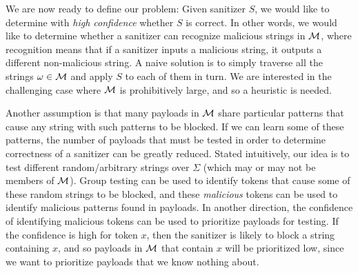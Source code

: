 We are now ready to define our problem: Given sanitizer $S$, we would like to determine with \emph{high confidence} whether $S$ is correct. In other words, we would like to determine whether a sanitizer can recognize malicious strings in $\cal{M}$, where recognition means that if a sanitizer inputs a malicious string, it outputs a different non-malicious string. A naive solution is to simply traverse all the strings $\omega \in {\cal M}$ and apply $S$ to each of them in turn. We are interested in the challenging case where ${\cal M}$ is prohibitively large, and so a heuristic is needed.

Another assumption is that many payloads in $\cal{M}$ share particular patterns that cause any string with such patterns to be blocked. If we can learn some of these patterns, the number of payloads that must be tested in order to determine correctness of a sanitizer can be greatly reduced. Stated intuitively, our idea is to test different random/arbitrary strings over $\Sigma$ (which may or may not be members of ${\cal M}$). Group testing can be used to identify tokens that cause some of these random strings to be blocked, and these \emph{malicious} tokens can be used to identify malicious patterns found in payloads. In another direction, the confidence of identifying malicious tokens can be used to prioritize payloads for testing.
If the confidence is high for token $x$, then the sanitizer is likely to block a string containing $x$, and so payloads in ${\cal M}$ that contain $x$ will be prioritized low, since we want to prioritize payloads that we know nothing about. 


